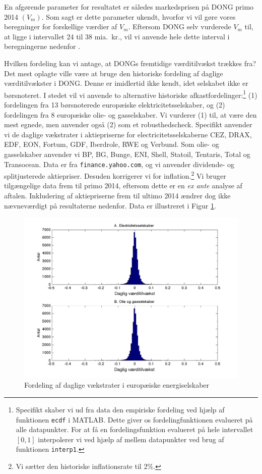 \documentclass{article}
\begin{document}
En afgørende parameter for resultatet er således markedsprisen på DONG primo 2014 $(V_m)$. Som sagt er dette parameter ukendt, hvorfor vi vil gøre vores beregninger for forskellige værdier af $V_m$. Eftersom DONG selv vurderede $V_m$ til, at ligge i intervallet 24 til 38 mia.\ kr., vil vi anvende hele dette interval i beregningerne nedenfor \citep{DONG2015b}.

Hvilken fordeling kan vi antage, at DONGs fremtidige værditilvækst trækkes fra? Det mest oplagte ville være at bruge den historiske fordeling af daglige værditilvækster i DONG. Denne er imidlertid ikke kendt, idet selskabet ikke er børsnoteret. I stedet vil vi anvende to alternative historiske afkastfordelinger:\footnote{Specifikt skaber vi ud fra data den empiriske fordeling ved hjælp af funktionen \texttt{ecdf} i MATLAB. Dette giver os fordelingfunktionen evalueret på alle datapunkter. For at få en fordelingsfunktion evalueret på hele intervallet $[0,1]$ interpolerer vi ved hjælp af mellem datapunkter ved brug af funktionen \texttt{interp1}.} (1)  fordelingen fra 13 børsnoterede europæiske elektricitetsselskaber, og (2) fordelingen fra 8 europæiske olie- og gasselskaber. Vi vurderer (1) til, at være den mest egnede, men anvender også (2) som et robusthedscheck. Specifikt anvender vi de daglige vækstrater i aktiepriserne for electricitetsselskaberne CEZ, DRAX, EDF, EON, Fortum, GDF, Iberdrole, RWE og Verbund. Som olie- og gasselskaber anvender vi BP, BG, Bunge, ENI, Shell, Statoil, Tentaris, Total og Transocean. Data er fra \texttt{finance.yahoo.com}, og vi anvender dividende- og splitjusterede aktiepriser. Desuden korrigerer vi for inflation.\footnote{Vi sætter den historiske inflationsrate til 2\%.} Vi bruger tilgængelige data frem til primo 2014, eftersom dette er en \emph{ex ante} analyse af aftalen. Inkludering af aktiepriserne frem til ultimo 2014 ændrer dog ikke nævneværdigt på resultaterne nedenfor. Data er illustreret i Figur \ref{fig:data_hist}.

\begin{figure}
\includegraphics[scale=0.8]{../matlab/figs/data_hist_guan}
\caption{Fordeling af daglige v\ae{}kstrater i europ\ae{}iske energiselskaber}
\label{fig:data_hist}
\end{figure}
\end{document}
